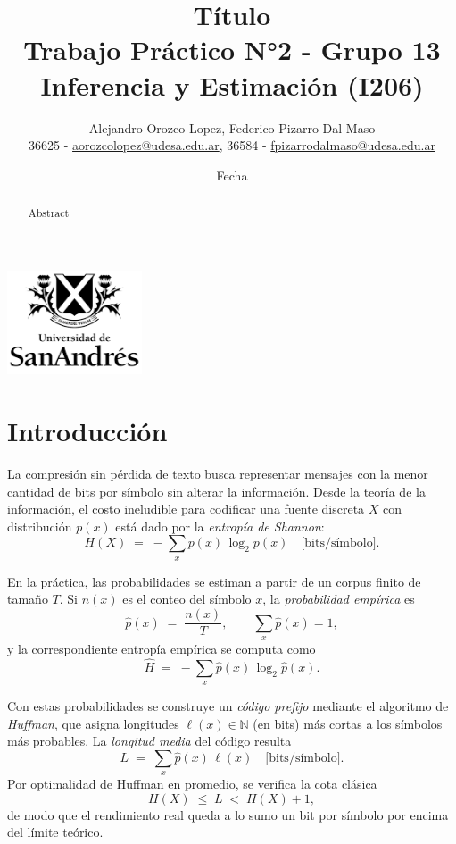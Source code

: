 \documentclass[12pt, a4paper]{article}
\title{Título\\[2ex]\large Trabajo Práctico N°2 - Grupo 13\\[2ex]Inferencia y Estimación (I206)}
\author{Alejandro Orozco Lopez, Federico Pizarro Dal Maso\\[1ex]\small{36625 - \href{mailto:aorozcolopez@udesa.edu.ar}{aorozcolopez@udesa.edu.ar}, 36584 - \href{mailto:fpizarrodalmaso@udesa.edu.ar}{fpizarrodalmaso@udesa.edu.ar}}}
\date{Fecha}
\begin{document}
\captionsetup[subfloat]{captionskip=0pt}

\setlength{\parskip}{1em}

\captionsetup[table]{name=Tabla}

\maketitle

\begin{center}
    {\includegraphics[width=0.3\textwidth]{udesa_logo.png}}
\end{center}

\begin{abstract}
    
Abstract
\end{abstract}

\section*{Introducción}

La compresión sin pérdida de texto busca representar mensajes con la menor cantidad de bits por símbolo sin alterar la información. Desde la teoría de la información, el costo ineludible para codificar una fuente discreta \(X\) con distribución \(p(x)\) está dado por la \emph{entropía de Shannon}:
\[
H(X) \;=\; -\sum_{x} p(x)\,\log_2 p(x)
\quad\text{[bits/símbolo].}
\]

En la práctica, las probabilidades se estiman a partir de un corpus finito de tamaño \(T\). Si \(n(x)\) es el conteo del símbolo \(x\), la \emph{probabilidad empírica} es
\[
\hat p(x) \;=\; \frac{n(x)}{T},
\qquad
\sum_x \hat p(x)=1,
\]
y la correspondiente entropía empírica se computa como
\[
\hat H \;=\; -\sum_{x} \hat p(x)\,\log_2 \hat p(x).
\]

Con estas probabilidades se construye un \emph{código prefijo} mediante el algoritmo de \emph{Huffman}, que asigna longitudes \(\ell(x)\in\mathbb{N}\) (en bits) más cortas a los símbolos más probables. La \emph{longitud media} del código resulta
\[
L \;=\; \sum_{x} \hat p(x)\,\ell(x)
\quad\text{[bits/símbolo].}
\]
Por optimalidad de Huffman en promedio, se verifica la cota clásica
\[
H(X) \;\le\; L \;<\; H(X)+1,
\]
de modo que el rendimiento real queda a lo sumo un bit por símbolo por encima del límite teórico.
\end{document}
